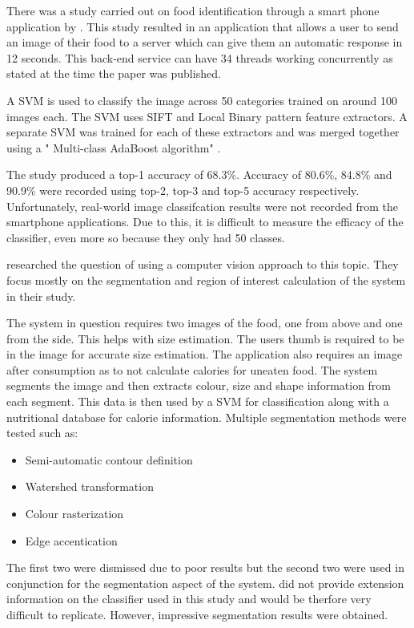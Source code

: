 There was a study carried out on food identification through a smart phone application by \parencite{chen2012automatic}.
This study resulted in an application that allows a user to send an image of their food to a server which can give them an automatic response in 12 seconds.
This back-end service can have 34 threads working concurrently as stated at the time the paper was published.

A SVM is used to classify the image across 50 categories trained on around 100 images each.
The SVM uses SIFT and Local Binary pattern feature extractors.
A separate SVM was trained for each of these extractors and was merged together using a " Multi-class AdaBoost algorithm" \parencite{chen2012automatic}.

The study produced a top-1 accuracy  of 68.3\%. Accuracy of 80.6\%, 84.8\% and 90.9\% were recorded using top-2, top-3 and top-5 accuracy respectively.
Unfortunately, real-world image classifcation results were not recorded from the smartphone applications.
Due to this, it is difficult to measure the efficacy of the classifier, even more so because they only had 50 classes.  


\parencite{villalobos2012image} researched the question of using a computer vision approach to this topic. They focus mostly on the segmentation and region of interest calculation of the system in their study.

The system in question requires two images of the food, one from above and one from the side. This helps with size estimation. The users thumb is required to be in the image for accurate size estimation. The application also requires an image after consumption as to not calculate calories for uneaten food.
The system segments the image and then extracts colour, size and shape information from each segment. This data is then used by a SVM for classification along with a nutritional database for calorie information. 
Multiple segmentation methods were tested such as:
\begin{itemize}
	\item{Semi-automatic contour definition}
	\item{Watershed transformation}
	\item{Colour rasterization}
	\item{Edge accentication}
\end{itemize}
The first two were dismissed due to poor results but the second two were used in conjunction for the segmentation aspect of the system.
\parencite{villalobos2012image} did not provide extension information on the classifier used in this study and would be therfore very difficult to replicate.
However, impressive segmentation results were obtained.

